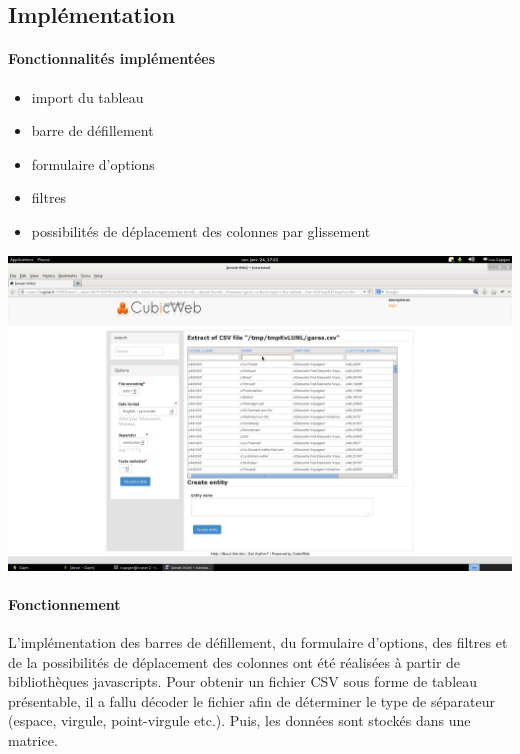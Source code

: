 \documentclass {report}
\begin{document}
\subsection{Implémentation}

\paragraph{Fonctionnalités implémentées}
\begin{itemize}
\item import du tableau
\item barre de défillement
\item formulaire d'options
\item filtres
\item possibilités de déplacement des colonnes par glissement
\end{itemize}

\begin{center}
\includegraphics[scale=0.7]{slick.png}
\end{center}

\paragraph{Fonctionnement}
L'implémentation des barres de défillement, du formulaire d'options, des filtres et de la possibilités de déplacement des colonnes ont été réalisées à partir de bibliothèques javascripts. Pour obtenir un fichier CSV sous forme de tableau présentable, il a fallu décoder le fichier afin de déterminer le type de séparateur (espace, virgule, point-virgule etc.). Puis, les données sont stockés dans une matrice.
\end{document}
